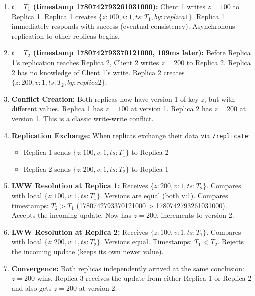 \documentclass[10pt,a4paper]{article}
\begin{document}
\begin{enumerate}
    \item \textbf{$t = T_1$ (timestamp 1780742793261031000):} Client 1 writes $z=100$ to Replica 1. Replica 1 creates $\{z:100, v:1, ts:T_1, by:replica1\}$. Replica 1 immediately responds with success (eventual consistency). Asynchronous replication to other replicas begins.
    
    \item \textbf{$t = T_2$ (timestamp 1780742793370121000, 109ms later):} Before Replica 1's replication reaches Replica 2, Client 2 writes $z=200$ to Replica 2. Replica 2 has no knowledge of Client 1's write. Replica 2 creates $\{z:200, v:1, ts:T_2, by:replica2\}$.
    
    \item \textbf{Conflict Creation:} Both replicas now have version 1 of key $z$, but with different values. Replica 1 has $z=100$ at version 1. Replica 2 has $z=200$ at version 1. This is a classic write-write conflict.
    
    \item \textbf{Replication Exchange:} When replicas exchange their data via \texttt{/replicate}:
    \begin{itemize}
        \item Replica 1 sends $\{z:100, v:1, ts:T_1\}$ to Replica 2
        \item Replica 2 sends $\{z:200, v:1, ts:T_2\}$ to Replica 1
    \end{itemize}
    
    \item \textbf{LWW Resolution at Replica 1:} Receives $\{z:200, v:1, ts:T_2\}$. Compares with local $\{z:100, v:1, ts:T_1\}$. Versions are equal (both v:1). Compares timestamps: $T_2 > T_1$ (1780742793370121000 > 1780742793261031000). Accepts the incoming update. Now has $z=200$, increments to version 2.
    
    \item \textbf{LWW Resolution at Replica 2:} Receives $\{z:100, v:1, ts:T_1\}$. Compares with local $\{z:200, v:1, ts:T_2\}$. Versions equal. Timestamps: $T_1 < T_2$. Rejects the incoming update (keeps its own newer value).
    
    \item \textbf{Convergence:} Both replicas independently arrived at the same conclusion: $z=200$ wins. Replica 3 receives the update from either Replica 1 or Replica 2 and also gets $z=200$ at version 2.
\end{enumerate}
\end{document}
